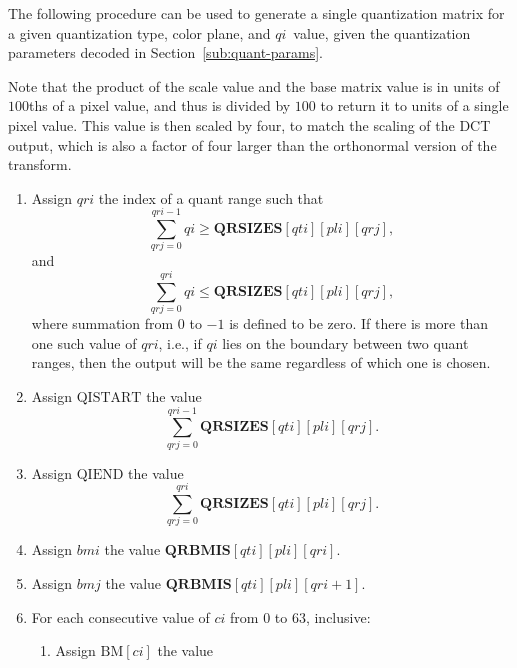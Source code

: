 \documentclass[9pt,letterpaper]{book}
\newcommand{\idx}[1]{{\ensuremath{\mathit{#1}}}}
\newcommand{\qti}{\idx{qti}}
\newcommand{\pli}{\idx{pli}}
\newcommand{\qi}{\idx{qi}}
\newcommand{\ci}{\idx{ci}}
\newcommand{\bmi}{\idx{bmi}}
\newcommand{\bmj}{\idx{bmj}}
\newcommand{\qri}{\idx{qri}}
\newcommand{\qrj}{\idx{qrj}}
\newcommand{\bitvar}[1]{\ensuremath{\mathbf{\bm{#1}}}}
\newcommand{\locvar}[1]{\ensuremath{\mathrm{#1}}}
\numberwithin{equation}{chapter}
\numberwithin{figure}{chapter}
\numberwithin{table}{chapter}
\begin{document}
The following procedure can be used to generate a single quantization matrix
 for a given quantization type, color plane, and \qi\ value, given the
 quantization parameters decoded in Section~\ref{sub:quant-params}.

Note that the product of the scale value and the base matrix value is in units
 of $100$ths of a pixel value, and thus is divided by $100$ to return it to
 units of a single pixel value.
This value is then scaled by four, to match the scaling of the DCT output,
 which is also a factor of four larger than the orthonormal version of the
 transform.

\begin{enumerate}
\item
Assign \locvar{\qri} the index of a quant range such that
\begin{displaymath}
\sum_{\qrj=0}^{\locvar{\qri}-1}
 \bitvar{\qi} \ge \bitvar{QRSIZES}[\bitvar{\qti}][\bitvar{\pli}][\qrj],
\end{displaymath}
 and
\begin{displaymath}
\sum_{\qrj=0}^{\locvar{\qri}}
 \bitvar{\qi} \le \bitvar{QRSIZES}[\bitvar{\qti}][\bitvar{\pli}][\qrj],
\end{displaymath}
 where summation from $0$ to $-1$ is defined to be zero.
If there is more than one such value of $\locvar{\qri}$, i.e., if \bitvar{\qi}
 lies on the boundary between two quant ranges, then the output will be the
 same regardless of which one is chosen.
\item
Assign \locvar{QISTART} the value
\begin{displaymath}
\sum_{\qrj=0}^{\qri-1} \bitvar{QRSIZES}[\bitvar{\qti}][\bitvar{\pli}][\qrj].
\end{displaymath}
\item
Assign \locvar{QIEND} the value
\begin{displaymath}
\sum_{\qrj=0}^{\qri} \bitvar{QRSIZES}[\bitvar{\qti}][\bitvar{\pli}][\qrj].
\end{displaymath}
\item
Assign \locvar{\bmi} the value
 $\bitvar{QRBMIS}[\bitvar{\qti}][\bitvar{\pli}][\qri]$.
\item
Assign \locvar{\bmj} the value
 $\bitvar{QRBMIS}[\bitvar{\qti}][\bitvar{\pli}][\qri+1]$.
\item
For each consecutive value of \locvar{\ci} from $0$ to $63$, inclusive:
\begin{enumerate}
\item
Assign $\locvar{BM}[\locvar{\ci}]$ the value
\begin{displaymath}

\end{displaymath}
\end{enumerate}
\end{enumerate}
\end{document}
